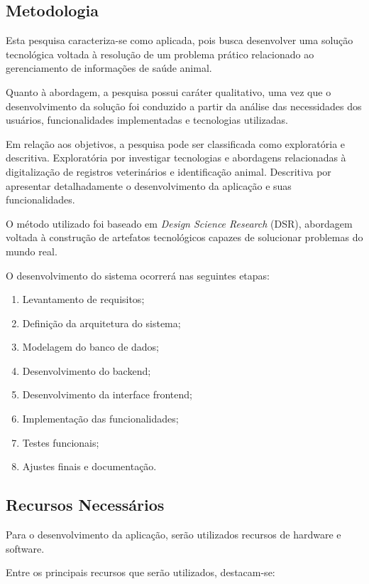 \documentclass{UNESC}
\begin{document}
\subsection{Metodologia}

Esta pesquisa caracteriza-se como aplicada, pois busca desenvolver uma solução tecnológica voltada à resolução de um problema prático relacionado ao gerenciamento de informações de saúde animal.

Quanto à abordagem, a pesquisa possui caráter qualitativo, uma vez que o desenvolvimento da solução foi conduzido a partir da análise das necessidades dos usuários, funcionalidades implementadas e tecnologias utilizadas.

Em relação aos objetivos, a pesquisa pode ser classificada como exploratória e descritiva. Exploratória por investigar tecnologias e abordagens relacionadas à digitalização de registros veterinários e identificação animal. Descritiva por apresentar detalhadamente o desenvolvimento da aplicação e suas funcionalidades.

O método utilizado foi baseado em \textit{Design Science Research} (DSR), abordagem voltada à construção de artefatos tecnológicos capazes de solucionar problemas do mundo real.

O desenvolvimento do sistema ocorrerá nas seguintes etapas:

\begin{enumerate}
    \item Levantamento de requisitos;
    \item Definição da arquitetura do sistema;
    \item Modelagem do banco de dados;
    \item Desenvolvimento do backend;
    \item Desenvolvimento da interface frontend;
    \item Implementação das funcionalidades;
    \item Testes funcionais;
    \item Ajustes finais e documentação.
\end{enumerate}

\subsection{Recursos Necessários}

Para o desenvolvimento da aplicação, serão utilizados recursos de hardware e software.

Entre os principais recursos que serão utilizados, destacam-se:
\end{document}
